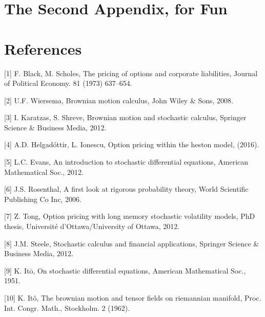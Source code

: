 \documentclass[12pt,twoside]{reedthesis}
\theoremstyle{definition}
\theoremstyle{definition}
\theoremstyle{remark}
\begin{document}
  \chapter{The Second Appendix, for
  Fun}\label{the-second-appendix-for-fun}
  
  \backmatter
  
  \chapter*{References}\label{references}
  
  \noindent
  
  \setlength{\parindent}{-0.20in} \setlength{\leftskip}{0.20in}
  \setlength{\parskip}{8pt}
  
  \hypertarget{refs}{}
  \hypertarget{ref-black1973pricing}{}
  {[}1{]} F. Black, M. Scholes, The pricing of options and corporate
  liabilities, Journal of Political Economy. 81 (1973) 637--654.
  
  \hypertarget{ref-ubbo}{}
  {[}2{]} U.F. Wiersema, Brownian motion calculus, John Wiley \& Sons,
  2008.
  
  \hypertarget{ref-karatzas2012brownian}{}
  {[}3{]} I. Karatzas, S. Shreve, Brownian motion and stochastic calculus,
  Springer Science \& Business Media, 2012.
  
  \hypertarget{ref-helgadottir2016option}{}
  {[}4{]} A.D. Helgadóttir, L. Ionescu, Option pricing within the heston
  model, (2016).
  
  \hypertarget{ref-evans}{}
  {[}5{]} L.C. Evans, An introduction to stochastic differential
  equations, American Mathematical Soc., 2012.
  
  \hypertarget{ref-rosenthal}{}
  {[}6{]} J.S. Rosenthal, A first look at rigorous probability theory,
  World Scientific Publishing Co Inc, 2006.
  
  \hypertarget{ref-tong2012option}{}
  {[}7{]} Z. Tong, Option pricing with long memory stochastic volatility
  models, PhD thesis, Université d'Ottawa/University of Ottawa, 2012.
  
  \hypertarget{ref-steele2012stochastic}{}
  {[}8{]} J.M. Steele, Stochastic calculus and financial applications,
  Springer Science \& Business Media, 2012.
  
  \hypertarget{ref-ito1951}{}
  {[}9{]} K. Itō, On stochastic differential equations, American
  Mathematical Soc., 1951.
  
  \hypertarget{ref-ito1962}{}
  {[}10{]} K. Itô, The brownian motion and tensor fields on riemannian
  manifold, Proc. Int. Congr. Math., Stockholm. 2 (1962).
  
\end{document}
